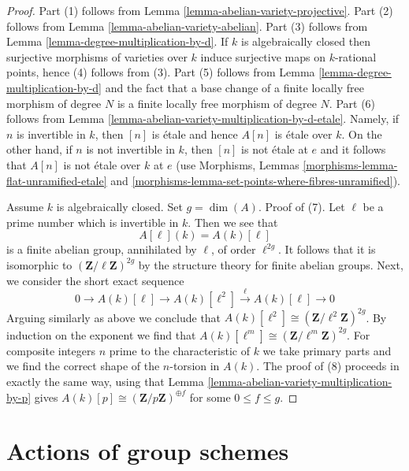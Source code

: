 \begin{proof}
Part (1) follows from Lemma \ref{lemma-abelian-variety-projective}.
Part (2) follows from Lemma \ref{lemma-abelian-variety-abelian}.
Part (3) follows from Lemma \ref{lemma-degree-multiplication-by-d}.
If $k$ is algebraically closed then surjective morphisms of varieties
over $k$ induce surjective maps on $k$-rational points, hence
(4) follows from (3).
Part (5) follows from Lemma \ref{lemma-degree-multiplication-by-d}
and the fact that a base change of a finite locally free morphism
of degree $N$ is a finite locally free morphism of degree $N$.
Part (6) follows from 
Lemma \ref{lemma-abelian-variety-multiplication-by-d-etale}.
Namely, if $n$ is invertible in $k$, then $[n]$ is \'etale
and hence $A[n]$ is \'etale over $k$.
On the other hand, if $n$ is not invertible in $k$, then
$[n]$ is not \'etale at $e$ and it follows that $A[n]$
is not \'etale over $k$ at $e$ (use
Morphisms, Lemmas \ref{morphisms-lemma-flat-unramified-etale} and
\ref{morphisms-lemma-set-points-where-fibres-unramified}).

\medskip\noindent
Assume $k$ is algebraically closed. Set $g = \dim(A)$. Proof of (7).
Let $\ell$ be a prime number which is invertible in $k$. Then we see that
$$
A[\ell](k) = A(k)[\ell]
$$
is a finite abelian group, annihilated by $\ell$, of order $\ell^{2g}$.
It follows that it is isomorphic to $(\mathbf{Z}/\ell\mathbf{Z})^{2g}$
by the structure theory for finite abelian groups. Next, we consider
the short exact sequence
$$
0 \to A(k)[\ell] \to A(k)[\ell^2] \xrightarrow{\ell} A(k)[\ell] \to 0
$$
Arguing similarly as above we conclude that 
$A(k)[\ell^2] \cong (\mathbf{Z}/\ell^2\mathbf{Z})^{2g}$.
By induction on the exponent we find that
$A(k)[\ell^m] \cong (\mathbf{Z}/\ell^m\mathbf{Z})^{2g}$.
For composite integers $n$ prime to the characteristic of $k$
we take primary parts and we find the correct shape of the
$n$-torsion in $A(k)$.
The proof of (8) proceeds in exactly the same way, using that
Lemma \ref{lemma-abelian-variety-multiplication-by-p} gives
$A(k)[p] \cong (\mathbf{Z}/p\mathbf{Z})^{\oplus f}$ for some $0 \leq f \leq g$.
\end{proof}







\section{Actions of group schemes}
\label{section-action-group-scheme}


